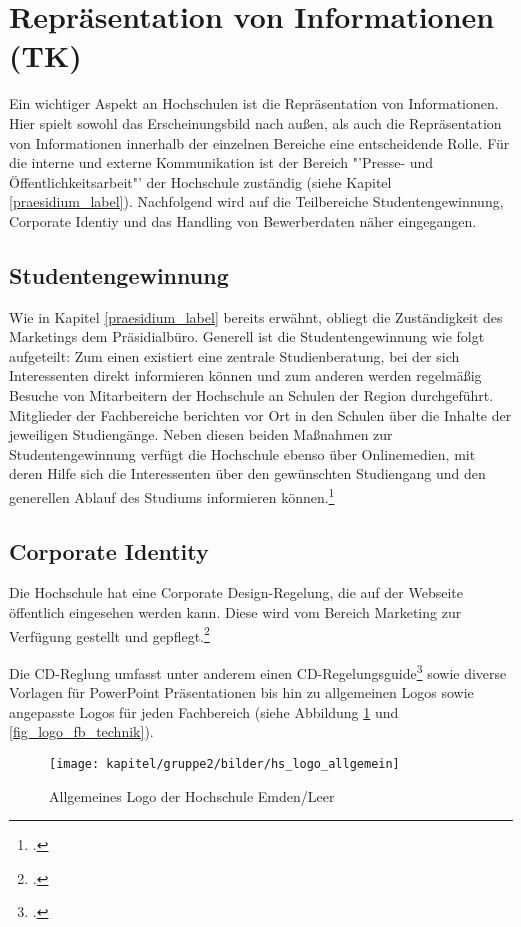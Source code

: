 \section{Repräsentation von Informationen (TK)}
Ein wichtiger Aspekt an Hochschulen ist die Repräsentation von Informationen. Hier spielt sowohl das 
Erscheinungsbild nach außen, als auch die Repräsentation von Informationen innerhalb der einzelnen Bereiche 
eine entscheidende Rolle. Für die interne und externe Kommunikation ist der Bereich "'Presse- und 
Öffentlichkeitsarbeit"' der Hochschule zuständig (siehe Kapitel \ref{praesidium_label}). Nachfolgend wird auf 
die Teilbereiche Studentengewinnung, Corporate Identiy und das Handling von Bewerberdaten näher 
eingegangen.

\subsection{Studentengewinnung}
Wie in Kapitel \ref{praesidium_label} bereits erwähnt, obliegt die Zuständigkeit des Marketings dem 
Präsidialbüro. Generell ist die Studentengewinnung wie folgt aufgeteilt: Zum einen existiert eine zentrale 
Studienberatung, bei der sich Interessenten direkt informieren können und zum anderen werden regelmäßig 
Besuche von Mitarbeitern der Hochschule an Schulen der Region durchgeführt. Mitglieder der Fachbereiche 
berichten vor Ort in den Schulen über die Inhalte der jeweiligen Studiengänge. Neben diesen beiden 
Maßnahmen zur Studentengewinnung verfügt die Hochschule ebenso über Onlinemedien, mit deren Hilfe sich 
die Interessenten über den gewünschten Studiengang und den generellen Ablauf des  Studiums informieren 
können.\footcite[Vgl.][]{gunter_muller_interview}


\subsection{Corporate Identity}
Die Hochschule hat eine Corporate Design-Regelung, die auf der Webseite öffentlich eingesehen werden 
kann. Diese wird vom Bereich Marketing zur Verfügung gestellt und 
gepflegt.\footcite[Vgl.][]{hsel_CD}

Die CD-Reglung umfasst unter anderem einen 
CD-Regelungsguide\footcite{hsel_CD_manual} sowie diverse Vorlagen für PowerPoint 
Präsentationen bis hin zu allgemeinen Logos sowie angepasste Logos für jeden Fachbereich (siehe Abbildung 
\ref{fig_logo_allgemein} und \ref{fig_logo_fb_technik}).

\begin{figure}[h!]
	\centering
	\texttt{[image: kapitel/gruppe2/bilder/hs\_logo\_allgemein]}
	\caption{Allgemeines Logo der Hochschule Emden/Leer\protect\footnotemark}
	\label{fig_logo_allgemein}
\end{figure}

